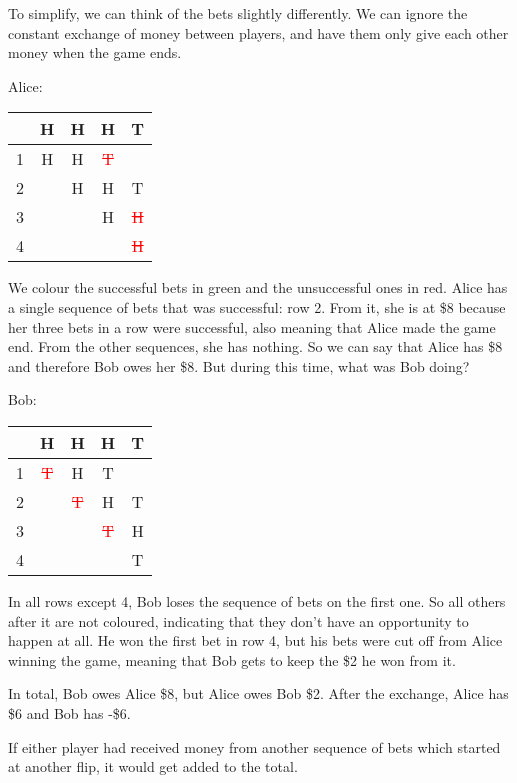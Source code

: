 \documentclass[english,12pt,a4paper,final]{article}
\begin{document}
To simplify, we can think of the bets slightly differently. We can ignore the constant exchange of money between players, and have them only give each other money when the game ends.

Alice:
\begin{tabular}{|c|c|c|c|c|}
	\hline
	& H & H & H & T \\
	\hline
	1 & \textcolor{OliveGreen}{H} & \textcolor{OliveGreen}{H} & \textcolor{red}{\sout{T}} &  \\
	\hline
	2 &  & \textcolor{OliveGreen}{H} & \textcolor{OliveGreen}{H} & \textcolor{OliveGreen}{T} \\
	\hline
	3 &  &  & \textcolor{OliveGreen}{H} & \textcolor{red}{\sout{H}} \\
	\hline
	4 &  &  &  & \textcolor{red}{\sout{H}} \\
	\hline
\end{tabular}

We colour the successful bets in green and the unsuccessful ones in red. Alice has a single sequence of bets that was successful: row 2. From it, she is at \$8 because her three bets in a row were successful, also meaning that Alice made the game end. From the other sequences, she has nothing. So we can say that Alice has \$8 and therefore Bob owes her \$8. But during this time, what was Bob doing?

Bob:
\begin{tabular}{|c|c|c|c|c|}
	\hline
	& H & H & H & T \\
	\hline
	1 & \textcolor{red}{\sout{T}} & H & T &  \\
	\hline
	2 &  & \textcolor{red}{\sout{T}} & H & T \\
	\hline
	3 &  &  & \textcolor{red}{\sout{T}} & H \\
	\hline
	4 &  &  &  & \textcolor{OliveGreen}{T} \\
	\hline
\end{tabular}

In all rows except 4, Bob loses the sequence of bets on the first one. So all others after it are not coloured, indicating that they don't have an opportunity to happen at all. He won the first bet in row 4, but his bets were cut off from Alice winning the game, meaning that Bob gets to keep the \$2 he won from it.

In total, Bob owes Alice \$8, but Alice owes Bob \$2. After the exchange, Alice has \$6 and Bob has -\$6.

If either player had received money from another sequence of bets which started at another flip, it would get added to the total.
\end{document}

